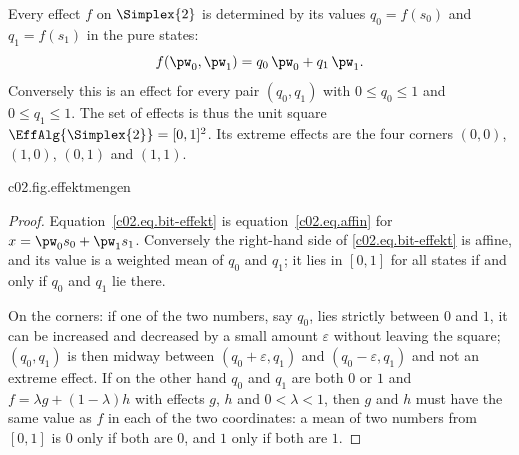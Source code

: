 \begin{proposition}\label{c02.prop.bit}
  Every effect $f$ on $\Simplex{2}$ is determined by its values $q_0 = f(s_0)$ and
  $q_1 = f(s_1)$ in the pure states:
  \begin{equation}\label{c02.eq.bit-effekt}
    f(\pw_0, \pw_1) = q_0\, \pw_0 + q_1\, \pw_1 .
  \end{equation}
  Conversely this is an effect for every pair $(q_0, q_1)$ with $0 \leq q_0 \leq 1$ and
  $0 \leq q_1 \leq 1$. The set of effects is thus the unit square
  $\EffAlg{\Simplex{2}} = [0,1]^2$. Its extreme effects are the four corners
  $(0,0)$, $(1,0)$, $(0,1)$ and $(1,1)$.
\end{proposition}

\begin{tpcfigure}{c02.fig.effektmengen}
  \caption{The effect sets of two theories. (a) Classical bit: the unit square in the
    coordinates $q_0 = f(s_0)$, $q_1 = f(s_1)$. The point $f$ is the effect of
    Figure~\ref{c02.fig.niveaulinien}(a). (b) Square bit, anticipating
    Proposition~\ref{c02.prop.quadrat}: a double pyramid; $b$ is plotted upwards, $a_x$
    and $a_y$ horizontally. The extreme effects are marked as squares, hidden edges are
    dotted. The bit has four extreme effects for two pure states, the square bit six for
    four pure states.}
\end{tpcfigure}

\begin{proof}
  Equation~\eqref{c02.eq.bit-effekt} is equation~\eqref{c02.eq.affin} for
  $x = \pw_0 s_0 + \pw_1 s_1$. Conversely the right-hand side of
  \eqref{c02.eq.bit-effekt} is affine, and its value is a weighted mean of $q_0$ and
  $q_1$; it lies in $[0,1]$ for all states if and only if $q_0$ and $q_1$ lie there.

  On the corners: if one of the two numbers, say $q_0$, lies strictly between $0$ and $1$,
  it can be increased and decreased by a small amount $\varepsilon$ without leaving the
  square; $(q_0, q_1)$ is then midway between $(q_0 + \varepsilon, q_1)$ and
  $(q_0 - \varepsilon, q_1)$ and not an extreme effect. If on the other hand $q_0$ and
  $q_1$ are both $0$ or $1$ and $f = \lambda g + (1-\lambda) h$ with effects $g$, $h$ and
  $0 < \lambda < 1$, then $g$ and $h$ must have the same value as $f$ in each of the two
  coordinates: a mean of two numbers from $[0,1]$ is $0$ only if both are $0$, and $1$
  only if both are $1$.
\end{proof}

